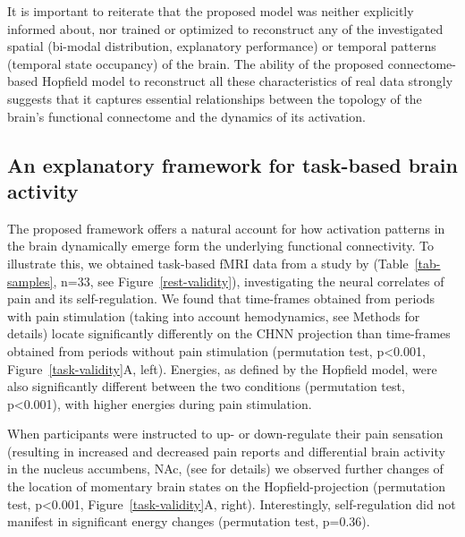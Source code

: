 \documentclass{article}
\begin{document}
It is important to reiterate that the proposed model was neither explicitly informed about, nor trained or optimized to reconstruct any of the investigated spatial (bi-modal distribution, explanatory performance) or temporal patterns (temporal state occupancy) of the brain.
The ability of the proposed connectome-based Hopfield model to reconstruct all these characteristics of real data strongly suggests that it captures essential relationships between the topology of the brain's functional connectome and the dynamics of its activation.

\subsection{An explanatory framework for task-based brain activity}\label{An explanatory framework for task-based brain activity}

The proposed framework offers a natural account for how activation patterns in the brain dynamically emerge form the
underlying functional connectivity. To illustrate this, we obtained task-based fMRI data from a study by
\citet{woo2015distinct} (Table~\ref{tab-samples}, n=33, see Figure~\ref{rest-validity}), investigating the neural
correlates of pain and its self-regulation. We found that time-frames obtained from periods with pain stimulation
(taking into account hemodynamics, see Methods for details) locate significantly differently on the CHNN projection
than time-frames obtained from periods without pain stimulation (permutation test, p\textless 0.001, Figure~\ref{task-validity}A,
left). Energies, as defined by the Hopfield model, were also significantly different between the two conditions
(permutation test, p\textless 0.001), with higher energies during pain stimulation.

When participants were instructed to up- or down-regulate their pain sensation (resulting in increased and decreased
pain reports and differential brain activity in the nucleus accumbens, NAc, (see \citep{woo2015distinct} for details)
we observed further changes of the location of momentary brain states on the Hopfield-projection (permutation test,
p\textless 0.001, Figure~\ref{task-validity}A, right). Interestingly, self-regulation did not manifest in significant energy changes
(permutation test, p=0.36).
\end{document}
